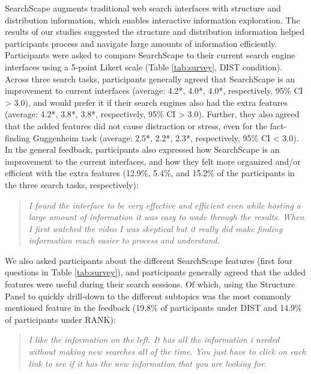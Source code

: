 SearchScape augments traditional web search interfaces with structure and distribution information, which enables interactive information exploration. The results of our studies suggested the structure and distribution information helped participants process and navigate large amounts of information efficiently.
Participants were asked to compare SearchScape to their current search engine interfaces using a 5-point Likert scale (Table \ref{tab:survey}, DIST condition). Across three search tasks, participants generally agreed that SearchScape is an improvement to current interfaces (average: 4.2*, 4.0*, 4.0*, respectively, 95\% CI > 3.0), and would prefer it if their search engines also had the extra features (average: 4.2*, 3.8*, 3.8*, respectively, 95\% CI > 3.0). Further, they also agreed that the added features did not cause distraction or stress, even for the fact-finding Guggenheim task (average: 2.5*, 2.2*, 2.3*, respectively, 95\% CI < 3.0). In the general feedback, participants also expressed how SearchScape is an improvement to the current interfaces, and how they felt more organized and/or efficient with the extra features (12.9\%, 5.4\%, and 15.2\% of the participants in the three search tasks, respectively):



\blockquote{\emph{I found the interface to be very effective and efficient even while hosting a large amount of information it was easy to wade through the results. When I first watched the video I was skeptical but it really did make finding information much easier to process and understand.}}

We also asked participants about the different SearchScape features (first four questions in Table \ref{tab:survey}), and participants generally agreed that the added features were useful during their search sessions. Of which, using the Structure Panel to quickly drill-down to the different subtopics was the most commonly mentioned feature in the feedback  (19.8\% of participants under DIST and 14.9\% of participants under RANK):

\blockquote{\emph{I like the information on the left. It has all the information i needed without making new searches all of the time. You just have to click on each link to see if it has the new information that you are looking for.}}


